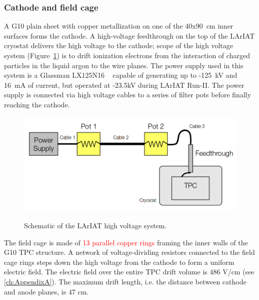 \subsubsection{Cathode and field cage}
A G10 plain sheet with copper metallization on one of the 40x90~cm inner surfaces forms the cathode. 
A high-voltage feedthrough on the top of the LArIAT cryostat delivers the high voltage to the cathode; scope of the high voltage system (Figure~\ref{fig:HVScheme}) is to drift ionization electrons from the interaction of charged particles in the liquid argon to the wire planes.  The power supply used in this system is a Glassman LX125N16 ~\cite{GlassmanPS} capable of generating up to -125~kV and 16~mA of current, but operated at -23.5kV during LArIAT Run-II. The power supply is connected via high voltage cables to a series of filter pots before finally reaching the cathode. 

\begin{figure}[htb]
\centering
\includegraphics[scale=0.35]{Chapter-3/Images//HVSchematic.png}\\
\caption{Schematic of the LArIAT high voltage system.}
\label{fig:HVScheme}
\end{figure}%



The field cage is made of \textcolor{red}{13 parallel copper rings} framing the inner walls of the G10 TPC structure. A network of voltage-dividing resistors connected to the field cage rings steps down the high voltage from the cathode to form a uniform electric field. The electric field over the entire TPC drift volume is  486 V/cm (see \ref{ch:AppendixA}). The  maximum drift length, i.e. the distance between cathode and anode planes, is 47 cm.

